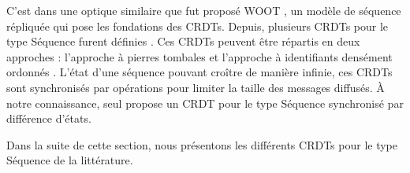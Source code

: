 C'est dans une optique similaire que fut proposé WOOT \cite{2006-woot-oster}, un modèle de séquence répliquée qui pose les fondations des \acp{CRDT}.
Depuis, plusieurs \acp{CRDT} pour le type Séquence furent définies \cite{ROH2011354, 2009-treedoc-preguica, 2009-logoot-weiss}.
Ces \acp{CRDT} peuvent être répartis en deux approches : l'approche à pierres tombales \cite{2006-woot-oster,ROH2011354} et l'approche à identifiants densément ordonnés \cite{2009-treedoc-preguica,2009-logoot-weiss}.
L'état d'une séquence pouvant croître de manière infinie, ces \acp{CRDT} sont synchronisés par opérations pour limiter la taille des messages diffusés.
À notre connaissance, seul \cite{2021-these-vic} propose un \ac{CRDT} pour le type Séquence synchronisé par différence d'états.

Dans la suite de cette section, nous présentons les différents \acp{CRDT} pour le type Séquence de la littérature.
